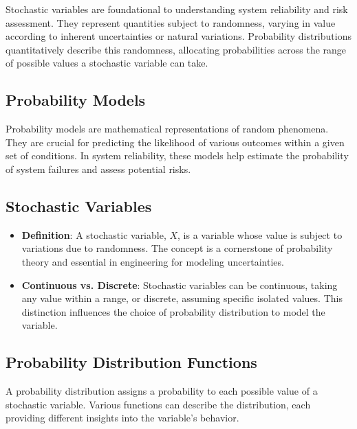 

Stochastic variables are foundational to understanding system reliability and risk assessment. They represent quantities subject to randomness, varying in value according to inherent uncertainties or natural variations. Probability distributions quantitatively describe this randomness, allocating probabilities across the range of possible values a stochastic variable can take.

\subsection*{Probability Models}
Probability models are mathematical representations of random phenomena. They are crucial for predicting the likelihood of various outcomes within a given set of conditions. In system reliability, these models help estimate the probability of system failures and assess potential risks.

\subsection*{Stochastic Variables}
\begin{itemize}
    \item \textbf{Definition}: A stochastic variable, $X$, is a variable whose value is subject to variations due to randomness. The concept is a cornerstone of probability theory and essential in engineering for modeling uncertainties.
    \item \textbf{Continuous vs. Discrete}: Stochastic variables can be continuous, taking any value within a range, or discrete, assuming specific isolated values. This distinction influences the choice of probability distribution to model the variable.
\end{itemize}

\subsection*{Probability Distribution Functions}
A probability distribution assigns a probability to each possible value of a stochastic variable. Various functions can describe the distribution, each providing different insights into the variable's behavior.

